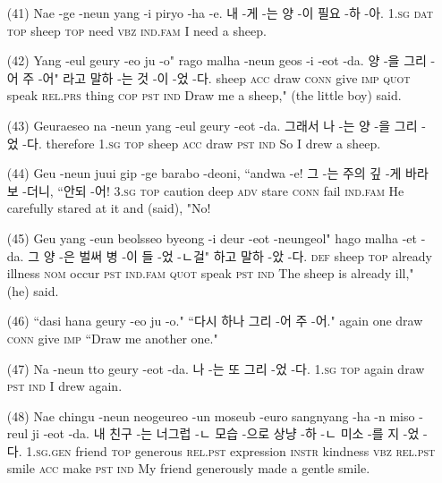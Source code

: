 \begin{itemize}
\item [(41)]
\tgl
		{Nae -ge -neun yang -i piryo -ha -e.}
		{내 -게 -는 양 -이 필요 -하 -아.}
		{\textsc{1.sg}	\textsc{dat}	\textsc{top}	sheep	\textsc{top}	need	\textsc{vbz}	\textsc{ind.fam}}
		{I need a sheep.}

\item [(42)]
\tgl
		{Yang -eul geury -eo ju -o" rago malha -neun geos -i -eot -da.}
		{양 -을 그리 -어 주 -어" 라고 말하 -는 것 -이 -었 -다.}
		{sheep	\textsc{acc}	draw	\textsc{conn}	give	\textsc{imp}	\textsc{quot}	speak	\textsc{rel.prs}	thing	\textsc{cop}	\textsc{pst}	\textsc{ind}}
		{Draw me a sheep," (the little boy) said.}
		
\item [(43)]
\tgl
		{Geuraeseo na -neun yang -eul geury -eot -da.}
		{그래서 나 -는 양 -을 그리 -었 -다.}
		{therefore	\textsc{1.sg}	\textsc{top}	sheep	\textsc{acc}	draw	\textsc{pst}	\textsc{ind}}
		{So I drew a sheep.}
		
\item [(44)]
\tgl
		{Geu -neun juui gip -ge barabo -deoni, ``andwa -e!}
		{그 -는 주의 깊 -게 바라보 -더니, ``안되 -어!}
		{\textsc{3.sg}	\textsc{top}	caution	deep	\textsc{adv}	stare	\textsc{conn}	fail	\textsc{ind.fam}}
		{He carefully stared at it and (said), "No!}

\item [(45)]
\tgl
		{Geu yang -eun beolsseo byeong -i deur -eot -neungeol" hago malha -et -da.}
		{그 양 -은 벌써 병 -이 들 -었 -ㄴ걸" 하고 말하 -았 -다.}
		{\textsc{def}	sheep	\textsc{top}	already	illness	\textsc{nom}	occur	\textsc{pst}	\textsc{ind.fam}	\textsc{quot}	speak	\textsc{pst}	\textsc{ind}}
		{The sheep is already ill," (he) said.}
		
\item [(46)]
\tgl
		{``dasi hana geury -eo ju -o."}
		{``다시 하나 그리 -어 주 -어."}
		{again	one	draw	\textsc{conn}	give	\textsc{imp}}
		{``Draw me another one."}

\item [(47)]
\tgl
		{Na -neun tto geury -eot -da.}
		{나 -는 또 그리 -었 -다.}
		{\textsc{1.sg}	\textsc{top}	again	draw	\textsc{pst}	\textsc{ind}}
		{I drew again.}

\item [(48)]
\tgl
		{Nae chingu -neun neogeureo -un moseub -euro sangnyang -ha -n miso -reul ji -eot -da.}
		{내 친구 -는 너그럽 -ㄴ 모습 -으로 상냥 -하 -ㄴ 미소 -를 지 -었 -다.}
		{\textsc{1.sg.gen}	friend	\textsc{top}	generous	\textsc{rel.pst}	expression	\textsc{instr}	kindness	\textsc{vbz}	\textsc{rel.pst}	smile	\textsc{acc}	make	\textsc{pst}	\textsc{ind}}
		{My friend generously made a gentle smile.}


\end{itemize}
